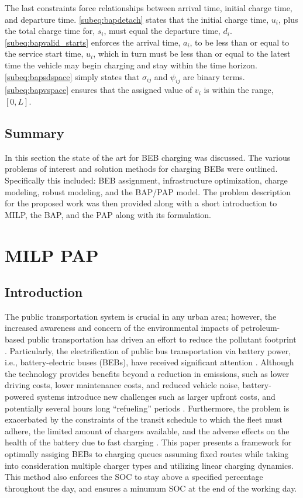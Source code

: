 \documentclass[ee,thesis]{usuthesis}
\begin{document}
The last constraints force relationships between arrival time, initial charge time, and departure time.
\autoref{subeq:bapdetach} states that the initial charge time, \(u_i\), plus the total charge time for, \(s_i\), must equal
the departure time, \(d_i\). \autoref{subeq:bapvalid_starts} enforces the arrival time, \(a_i\), to be less than or equal to
the service start time, \(u_i\), which in turn must be less than or equal to the latest time the vehicle may begin
charging and stay within the time horizon. \autoref{subeq:bapsdspace} simply states that \(\sigma_{ij}\) and \(\psi_{ij}\) are
binary terms. \autoref{subeq:bapvspace} ensures that the assigned value of \(v_i\) is within the range, \([0,L]\).

\section{Summary}
\label{sec:org9ec162a}
In this section the state of the art for BEB charging was discussed. The various problems of interest and solution
methods for charging BEBs were outlined. Specifically this included: BEB assignment, infrastructure optimization,
charge modeling, robust modeling, and the BAP/PAP model. The problem description for the proposed work was then provided
along with a short introduction to MILP, the BAP, and the PAP along with its formulation.
\chapter{MILP PAP}
\label{sec:milp-pap}
\section{Introduction}
\label{sec:milp-introduction}
The public transportation system is crucial in any urban area; however, the increased awareness and concern of the
environmental impacts of petroleum-based public transportation has driven an effort to reduce the pollutant footprint
\cite{de-2014-simul-elect,xylia-2018-role-charg,guida-2017-zeeus-repor-europ,li-2016-batter-elect}. Particularly,
the electrification of public bus transportation via battery power, i.e., battery-electric buses (BEBs), have received
significant attention \cite{li-2016-batter-elect}. Although the technology provides benefits beyond a reduction in
emissions, such as lower driving costs, lower maintenance costs, and reduced vehicle noise, battery-powered systems
introduce new challenges such as larger upfront costs, and potentially several hours long ``refueling'' periods
\cite{xylia-2018-role-charg,li-2016-batter-elect}. Furthermore, the problem is exacerbated by the constraints of the
transit schedule to which the fleet must adhere, the limited amount of chargers available, and the adverse effects on
the health of the battery due to fast charging \cite{lutsey-2019-updat-elect}. This paper presents a
framework for optimally assiging BEBs to charging queues assuming fixed routes while taking into consideration multiple
charger types and utilizing linear charging dynamics. This method also enforces the SOC to stay above a specified
percentage throughout the day, and ensures a minumum SOC at the end of the working day.
\end{document}
